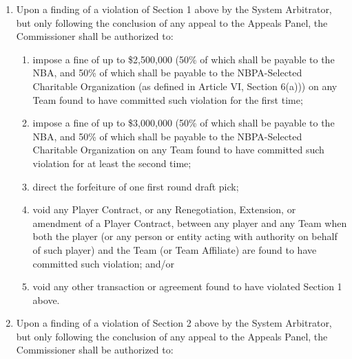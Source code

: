 \documentclass[
]{book}
\providecommand{\tightlist}{%
  \setlength{\itemsep}{0pt}\setlength{\parskip}{0pt}}
\begin{document}
\begin{enumerate}
\def\labelenumi{(\alph{enumi})}
\tightlist
\item
  Upon a finding of a violation of Section 1 above by the System Arbitrator, but only following the conclusion of any appeal to the Appeals Panel, the Commissioner shall be authorized to:

  \begin{enumerate}
  \def\labelenumii{(\roman{enumii})}
  \tightlist
  \item
    impose a fine of up to \$2,500,000 (50\% of which shall be payable to the NBA, and 50\% of which shall be payable to the NBPA-Selected Charitable Organization (as defined in Article VI, Section 6(a))) on any Team found to have committed such violation for the first time;
  \item
    impose a fine of up to \$3,000,000 (50\% of which shall be payable to the NBA, and 50\% of which shall be payable to the NBPA-Selected Charitable Organization on any Team found to have committed such violation for at least the second time;
  \item
    direct the forfeiture of one first round draft pick;
  \item
    void any Player Contract, or any Renegotiation, Extension, or amendment of a Player Contract, between any player and any Team when both the player (or any person or entity acting with authority on behalf of such player) and the Team (or Team Affiliate) are found to have committed such violation; and/or
  \item
    void any other transaction or agreement found to have violated Section 1 above.
  \end{enumerate}
\item
  Upon a finding of a violation of Section 2 above by the System Arbitrator, but only following the conclusion of any appeal to the Appeals Panel, the Commissioner shall be authorized to:


\end{enumerate}
\end{document}
